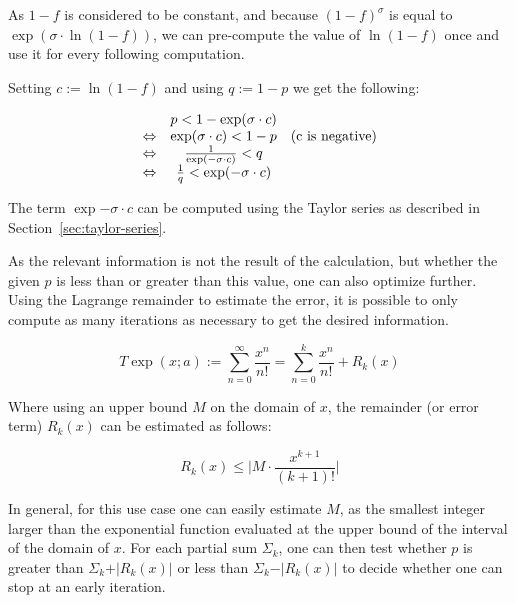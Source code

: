 \documentclass[11pt,a4paper,dvipsnames]{article}
\theoremstyle{definition}
\theoremstyle{definition}
\begin{document}
As $1-f$ is considered to be constant, and because ${(1-f)}^{\sigma}$ is equal
to $\exp(\sigma\cdot\ln(1-f))$, we can pre-compute the value of $\ln(1-f)$ once
and use it for every following computation.

Setting $c:= \ln(1 - f)$ and using $q := 1 - p$ we get the following:

\begin{equation*}
  \begin{array}[h]{ccc}
    & p < 1 - \exp(\sigma \cdot c) & \\
    \Leftrightarrow & \exp(\sigma \cdot c) < 1 - p & (\textrm{c is negative})\\
    \Leftrightarrow & \frac{1}{\exp(-\sigma \cdot c)} < q & \\
    \Leftrightarrow & \frac{1}{q} < \exp(-\sigma \cdot c) &
  \end{array}
\end{equation*}

The term $\exp{-\sigma \cdot c}$ can be computed using the Taylor series as
described in Section~\ref{sec:taylor-series}.

As the relevant information is not the result of the calculation, but whether
the given $p$ is less than or greater than this value, one can also optimize
further. Using the Lagrange remainder to estimate the error, it is possible to
only compute as many iterations as necessary to get the desired information.

\begin{equation*}
    T \exp(x; a) := \sum_{n=0}^{\infty}\frac{x^{n}}{n!} =
    \sum_{n=0}^k\frac{x^{n}}{n!} + R_{k}(x)
\end{equation*}

Where using an upper bound $M$ on the domain of $x$, the remainder (or error
term) $R_{k}(x)$ can be estimated as follows:

\begin{equation*}
  R_{k}(x) \leq \vert M \cdot \frac{x^{k+1}}{(k+1)!}\vert
\end{equation*}

In general, for this use case one can easily estimate $M$, as the smallest
integer larger than the exponential function evaluated at the upper bound of the
interval of the domain of $x$. For each partial sum $\Sigma_{k}$, one can then
test whether $p$ is greater than $\Sigma_k + \vert R_{k}(x) \vert$ or less than
$\Sigma_k - \vert R_{k}(x)\vert$ to decide whether one can stop at an early
iteration.
\end{document}
